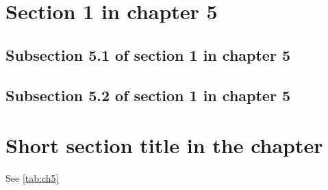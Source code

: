 \section{Section 1 in chapter 5}
\lipsum[2-4]

\subsection{Subsection 5.1 of section 1 in chapter 5}
\lipsum[5-7]

\subsection{Subsection 5.2 of section 1 in chapter 5}
\lipsum[8-11]

\clearpage{} %
\section[Long section title displayed in the table of content]{Short section title in the chapter}
\lipsum[11-18]
See \ref{tab:ch5}

